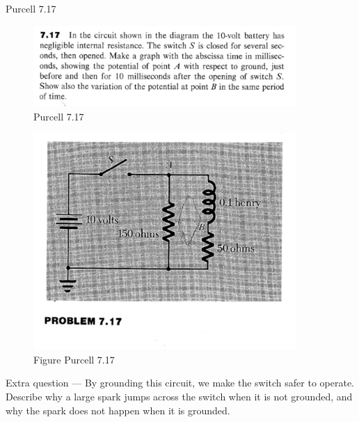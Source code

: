 \documentclass[makesolutionspdf]{esg8022pset}
\begin{document}
\begin{problem}{Purcell 7.17}
\begin{figure}[H]
    \centering
    \includegraphics[width = 10cm]{pu717}
    \caption{Purcell 7.17}
  \end{figure}
  
  \begin{figure}[H]
    \centering
    \includegraphics[width = 10cm]{figpu717}
    \caption{Figure Purcell 7.17}
  \end{figure}

 Extra question --- By grounding this circuit, we make the switch
safer to operate. Describe why a large spark jumps across the switch
when it is not grounded, and why the spark does not happen when it is
grounded.
\end{problem}
\end{document}
